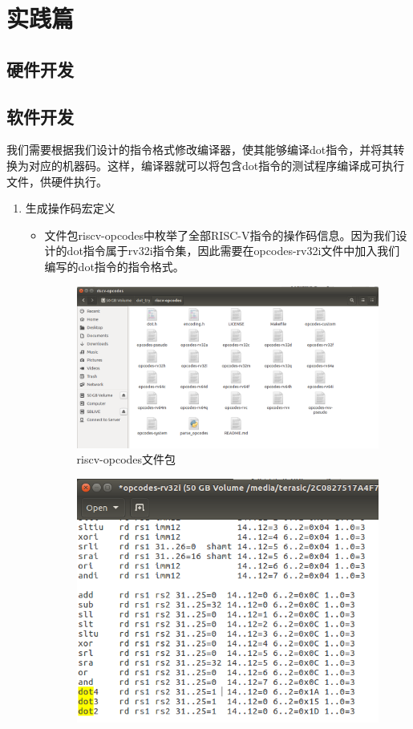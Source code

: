 \documentclass[a4paper, 14pt, oneside]{book} %
\numberwithin{equation}{subsection}
\begin{document}
	\section{实践篇}
	\subsection{硬件开发}
	
	\subsection{软件开发}
	我们需要根据我们设计的指令格式修改编译器，使其能够编译dot指令，并将其转换为对应的机器码。这样，编译器就可以将包含dot指令的测试程序编译成可执行文件，供硬件执行。
	\begin{enumerate}
		\item 生成操作码宏定义
		\begin{itemize}
			\item 文件包riscv-opcodes中枚举了全部RISC-V指令的操作码信息。因为我们设计的dot指令属于rv32i指令集，因此需要在opcodes-rv32i文件中加入我们编写的dot指令的指令格式。
				\begin{figure}[H]
					\centering  
					\includegraphics[scale=0.3]{img/1.png}   
					\caption{riscv-opcodes文件包}
				\end{figure}
				\begin{figure}[H]
					\centering  
					\includegraphics[scale=0.5]{img/2.png}   

\end{figure}
\end{itemize}
\end{enumerate}
\end{document}
